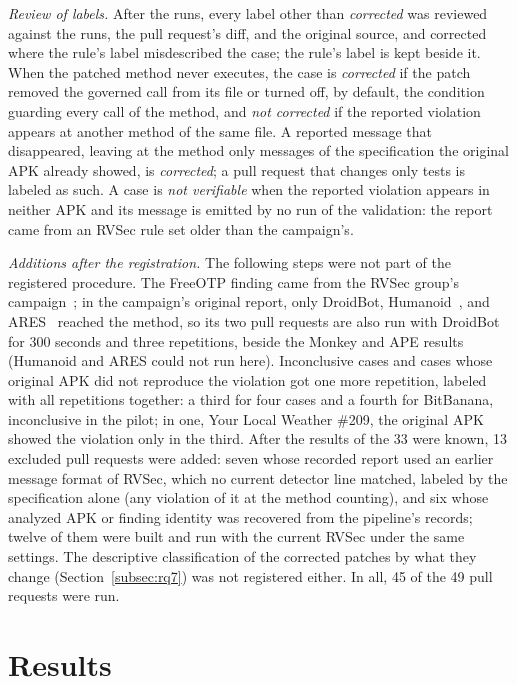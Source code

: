 \documentclass[conference]{IEEEtran}
\begin{document}
\emph{Review of labels.} After the runs, every label other than \emph{corrected}
was reviewed against the runs, the pull request's diff, and the original
source, and corrected where the rule's label misdescribed the case; the rule's
label is kept beside it. When the patched method never executes, the case is
\emph{corrected} if the patch removed the governed call from its file or turned
off, by default, the condition guarding every call of the method, and \emph{not
corrected} if the reported violation appears at another method of the same
file. A reported message that disappeared, leaving at the method only messages
of the specification the original APK already showed, is \emph{corrected}; a
pull request that changes only tests is labeled as such. A case is \emph{not
verifiable} when the reported violation appears in neither APK and its message
is emitted by no run of the validation: the report came from an RVSec rule set
older than the campaign's.

\emph{Additions after the registration.} The following steps were not part of
the registered procedure. The FreeOTP finding came from the RVSec group's
campaign~\cite{costa2026effectiveness}; in the campaign's original report, only
DroidBot, Humanoid~\cite{li2019humanoid}, and ARES~\cite{romdhana2022ares}
reached the method, so its two pull requests are also run with DroidBot for 300
seconds and three repetitions, beside the Monkey and APE results (Humanoid and
ARES could not run here). Inconclusive cases and cases whose original APK did
not reproduce the violation got one more repetition, labeled with all
repetitions together: a third for four cases and a fourth for BitBanana,
inconclusive in the pilot; in one, Your Local Weather \#209, the original APK
showed the violation only in the third. After the results of the 33 were known, 13 excluded pull requests
were added: seven whose recorded report used an earlier message format of
RVSec, which no current detector line matched, labeled by the specification
alone (any violation of it at the method counting), and six whose analyzed APK
or finding identity was recovered from the pipeline's records; twelve of them
were built and run with the current RVSec under the same settings. The descriptive classification of the corrected patches by what they change
(Section~\ref{subsec:rq7}) was not registered either. In all, 45 of the 49
pull requests were run.

\section{Results}
\label{sec:results}
\end{document}
